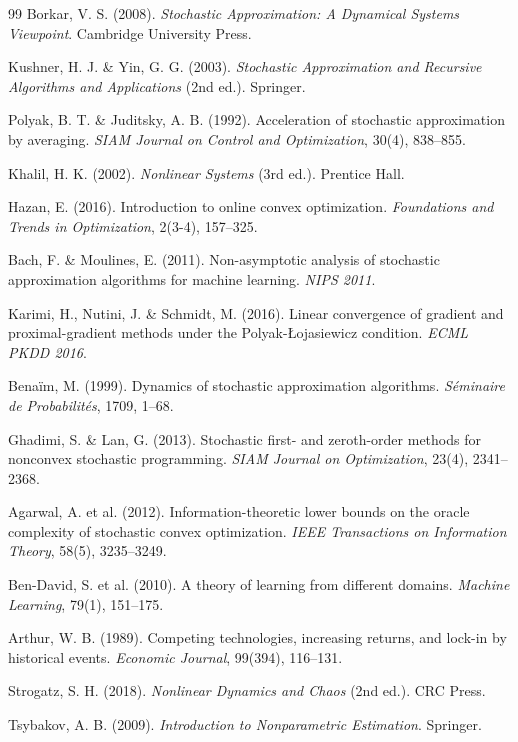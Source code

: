 \begin{thebibliography}{99}
Borkar, V. S. (2008).
\emph{Stochastic Approximation: A Dynamical Systems Viewpoint}. Cambridge University Press.

Kushner, H. J. \& Yin, G. G. (2003).
\emph{Stochastic Approximation and Recursive Algorithms and Applications} (2nd ed.). Springer.

Polyak, B. T. \& Juditsky, A. B. (1992).
Acceleration of stochastic approximation by averaging.
\emph{SIAM Journal on Control and Optimization}, 30(4), 838--855.

Khalil, H. K. (2002).
\emph{Nonlinear Systems} (3rd ed.). Prentice Hall.

Hazan, E. (2016).
Introduction to online convex optimization.
\emph{Foundations and Trends in Optimization}, 2(3-4), 157--325.

Bach, F. \& Moulines, E. (2011).
Non-asymptotic analysis of stochastic approximation algorithms for machine learning.
\emph{NIPS 2011}.

Karimi, H., Nutini, J. \& Schmidt, M. (2016).
Linear convergence of gradient and proximal-gradient methods under the Polyak-{\L}ojasiewicz condition.
\emph{ECML PKDD 2016}.

Bena\"im, M. (1999).
Dynamics of stochastic approximation algorithms.
\emph{S\'eminaire de Probabilit\'es}, 1709, 1--68.

Ghadimi, S. \& Lan, G. (2013).
Stochastic first- and zeroth-order methods for nonconvex stochastic programming.
\emph{SIAM Journal on Optimization}, 23(4), 2341--2368.

Agarwal, A. et al. (2012).
Information-theoretic lower bounds on the oracle complexity of stochastic convex optimization.
\emph{IEEE Transactions on Information Theory}, 58(5), 3235--3249.

Ben-David, S. et al. (2010).
A theory of learning from different domains.
\emph{Machine Learning}, 79(1), 151--175.

Arthur, W. B. (1989).
Competing technologies, increasing returns, and lock-in by historical events.
\emph{Economic Journal}, 99(394), 116--131.

Strogatz, S. H. (2018).
\emph{Nonlinear Dynamics and Chaos} (2nd ed.). CRC Press.

Tsybakov, A. B. (2009).
\emph{Introduction to Nonparametric Estimation}. Springer.


\end{thebibliography}
